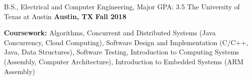 \begin{cventries}
  \cventry
    {\normalsize B.S., Electrical and Computer Engineering, Major GPA: \large   3.5}
    {\large The University of Texas at Austin}
    {\normalsize \textbf{Austin, TX}}
    {\normalsize \textbf{Fall 2018}}
    {
      \begin{cvitems}
        \item {\normalsize \textbf{Coursework:} Algorithms, Concurrent and Distributed Systems (Java Concurrency, Cloud Computing), Software Design and Implementation (C/C++, Java, Data Structures), Software Testing, Introduction to Computing Systems (Assembly, Computer Architecture), Introduction to Embedded Systems (ARM Assembly)}
      \end{cvitems}
    }
\end{cventries}
